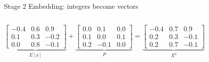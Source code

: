 \documentclass[aspectratio=169,10pt]{beamer}
\begin{document}
\begin{frame}{Stage 2 \textbullet{} Embedding: integers become vectors}
\begin{columns}[T,onlytextwidth]
\vspace{1mm}
{\scriptsize\setlength{\arraycolsep}{3pt}
\[
\underbrace{\begin{bmatrix}-0.4&0.6&0.9\\0.1&0.3&-0.2\\0.0&0.8&-0.1\end{bmatrix}}_{E[x]}
+\underbrace{\begin{bmatrix}0.0&0.1&0.0\\0.1&0.0&0.1\\0.2&-0.1&0.0\end{bmatrix}}_{P}
=\underbrace{\begin{bmatrix}-0.4&0.7&0.9\\0.2&0.3&-0.1\\0.2&0.7&-0.1\end{bmatrix}}_{X^0}
\]}
\end{columns}
\end{frame}
\end{document}
